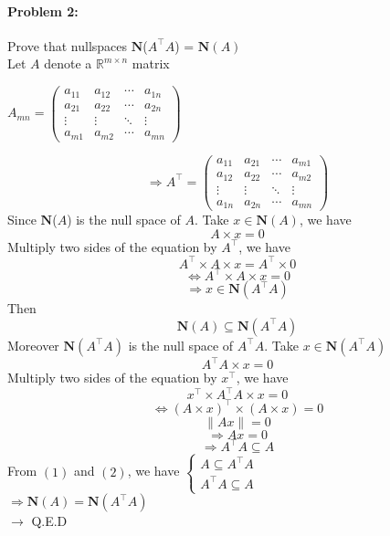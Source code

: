 \documentclass[11pt]{article}
\begin{document}
\paragraph{Problem 2:}
\label{sec::problem2} Prove that nullspaces $\textbf{N}$($A^\top A$) = $\textbf{N}(A)$
\\[0.4cm]
Let $A$ denote a $\mathbb{R}^{m\times n}$ matrix
\begin{center}
$A_{mn} = 
    \begin{pmatrix}
    a_{11} & a_{12} & \cdots & a_{1n} \\
    a_{21} & a_{22} & \cdots & a_{2n} \\
    \vdots  & \vdots  & \ddots & \vdots  \\
    a_{m1} & a_{m2} & \cdots & a_{mn} 
    \end{pmatrix}
$
\end{center}
$$\Rightarrow A^\top = 
 \begin{pmatrix}
  a_{11} & a_{21} & \cdots & a_{m1} \\
  a_{12} & a_{22} & \cdots & a_{m2} \\
  \vdots  & \vdots  & \ddots & \vdots  \\
  a_{1n} & a_{2n} & \cdots & a_{mn} 
 \end{pmatrix}
$$
Since $\textbf{N}$($A$) is the null space of $A$. Take $x \in \textbf{N}(A)$, we have 
$$A \times x = 0$$
Multiply two sides of the equation by $A^\top$, we have
$$A^\top \times A \times x  = A^\top \times 0$$
$$\Leftrightarrow A^\top \times A \times x = 0$$
$$\Rightarrow x \in \textbf{N}(A^\top A)$$
Then
\begin{equation}
    \textbf{N}(A) \subseteq \textbf{N}(A^\top A)
\end{equation}
Moreover $\textbf{N}(A^\top A)$ is the null space of $A^\top A$. Take $x \in \textbf{N}(A^\top A) $
$$A^\top A \times x = 0$$
Multiply two sides of the equation by $x^\top$, we have
$$x^\top \times A^\top A \times x = 0 $$
$$\Leftrightarrow (A \times x)^\top \times (A \times x) = 0 $$
$$\|Ax\| = 0 $$
$$\Rightarrow Ax = 0 $$
\begin{equation}
    \Rightarrow A^\top A \subseteq A
\end{equation}
From $(1)$ and $(2)$, we have
$ 
\begin{cases}
    A \subseteq A^\top A\\
    A^\top A\subseteq A
\end{cases}
$\\[0.2cm] 
$\Rightarrow\textbf{N}(A) = \textbf{N}(A^\top A)$\\[0.2cm]
$\rightarrow$ Q.E.D
\end{document}
